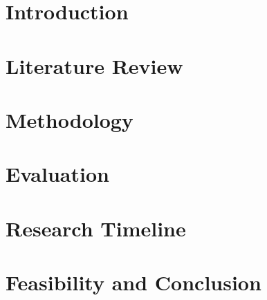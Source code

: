 \documentclass[a4paper, 12pt]{article}
\begin{document}


\date{}
\tableofcontents
\newpage


\section{Introduction}

\newpage

\section{Literature Review}

\newpage

\section{Methodology}

\newpage

\section{Evaluation}

\newpage

\section{Research Timeline}

\newpage

\section{Feasibility and Conclusion}

\newpage



\end{document}
